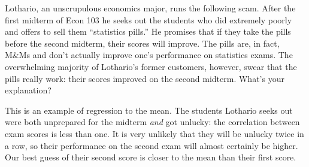\documentclass[addpoints,12pt]{exam}
\begin{document}
\begin{questions}
\question Lothario, an unscrupulous economics major, runs the following scam. After the first midterm of Econ 103 he seeks out the students who did extremely poorly and offers to sell them ``statistics pills.'' He promises that if they take the pills before the second midterm, their scores will improve. The pills are, in fact, M\&Ms and don't actually improve one's performance on statistics exams. The overwhelming majority of Lothario's former customers, however, swear that the pills really work: their scores improved on the second midterm. What's your explanation?
\begin{solution}
This is an example of regression to the mean. The students Lothario seeks out were both unprepared for the midterm \emph{and} got unlucky: the correlation between exam scores is less than one. It is very unlikely that they will be unlucky twice in a row, so their performance on the second exam will almost certainly be higher. Our best guess of their second score is closer to the mean than their first score.
\end{solution}
	
\end{questions}
\end{document}
